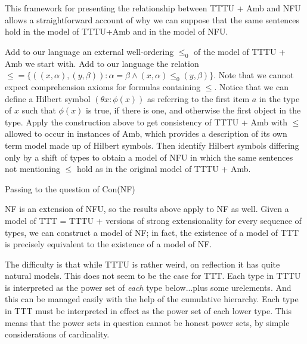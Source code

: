 \documentclass{slides}
\begin{document}
\begin{slide}

This framework for presenting the relationship between TTTU + Amb and NFU allows a straightforward account of why 
we can suppose that the same sentences hold in the model of TTTU+Amb and in the model of NFU.

Add to our language an external well-ordering $\leq_0$ of the model of TTTU + Amb we start with.  Add to our language the
relation $\leq = \{((x,\alpha),(y,\beta)):\alpha=\beta \wedge (x,\alpha) \leq_0 (y,\beta)\}$.  Note that we cannot expect comprehension axioms for formulas containing $\leq$.  Notice that we can define a Hilbert symbol $(\theta x:\phi(x))$ as referring to the first item $a$ in the type of $x$ such that $\phi(x)$ is true, if there is one, and otherwise the first object in the type.  Apply the construction above to get consistency of TTTU + Amb with $\leq$ allowed to occur in instances of Amb, which provides a description of its own term
model made up of Hilbert symbols.  Then identify Hilbert symbols differing only by a shift of types to obtain a model of NFU in which the same sentences not mentioning $\leq$ hold as in the original model of TTTU + Amb.

\end{slide}

\begin{slide}

{\Large Passing to the question of Con(NF)}

NF is an extension of NFU, so the results above apply to NF as well.  Given a model of TTT = TTTU + versions of strong extensionality for every sequence of types, we can construct a model of NF; in fact, the existence of a model of TTT is precisely equivalent to the existence of a model of NF.

The difficulty is that while TTTU is rather weird, on reflection it has quite natural models.  This does not seem to be the case for TTT.  Each type in TTTU is interpreted as the power set of {\em each} type below...plus some urelements.  And this can be managed easily with the help of the cumulative hierarchy.  Each type in TTT must be interpreted in effect as the power set of each lower type.  This means that the power sets in question cannot be honest power sets, by simple considerations of cardinality.

\end{slide}
\end{document}
